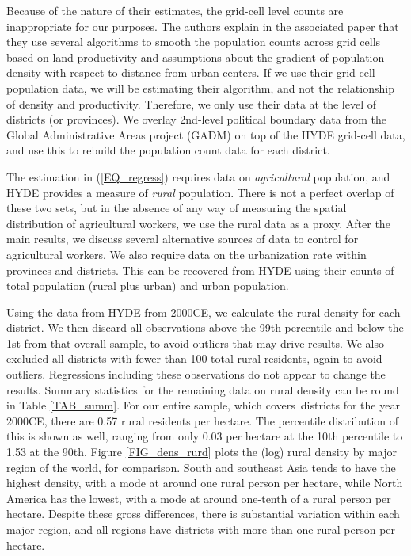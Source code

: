 \documentclass[11pt]{article}
\begin{document}
Because of the nature of their estimates, the grid-cell level counts are inappropriate for our purposes. The authors explain in the associated paper that they use several algorithms to smooth the population counts across grid cells based on land productivity and assumptions about the gradient of population density with respect to distance from urban centers. If we use their grid-cell population data, we will be estimating their algorithm, and not the relationship of density and productivity. Therefore, we only use their data at the level of districts (or provinces). We overlay 2nd-level political boundary data from the Global Administrative Areas project (GADM) on top of the HYDE grid-cell data, and use this to rebuild the population count data for each district.

The estimation in (\ref{EQ_regress}) requires data on \textit{agricultural} population, and HYDE provides a measure of \textit{rural} population. There is not a perfect overlap of these two sets, but in the absence of any way of measuring the spatial distribution of agricultural workers, we use the rural data as a proxy. After the main results, we discuss several alternative sources of data to control for agricultural workers. We also require data on the urbanization rate within provinces and districts. This can be recovered from HYDE using their counts of total population (rural plus urban) and urban population.

Using the data from HYDE from 2000CE, we calculate the rural density for each district. We then discard all observations above the 99th percentile and below the 1st from that overall sample, to avoid outliers that may drive results. We also excluded all districts with fewer than 100 total rural residents, again to avoid outliers. Regressions including these observations do not appear to change the results. Summary statistics for the remaining data on rural density can be round in Table \ref{TAB_summ}. For our entire sample, which covers\districts \ districts for the year 2000CE, there are 0.57 rural residents per hectare. The percentile distribution of this is shown as well, ranging from only 0.03 per hectare at the 10th percentile to 1.53 at the 90th. Figure \ref{FIG_dens_rurd} plots the (log) rural density by major region of the world, for comparison. South and southeast Asia tends to have the highest density, with a mode at around one rural person per hectare, while North America has the lowest, with a mode at around one-tenth of a rural person per hectare. Despite these gross differences, there is substantial variation within each major region, and all regions have districts with more than one rural person per hectare. 
\end{document}
